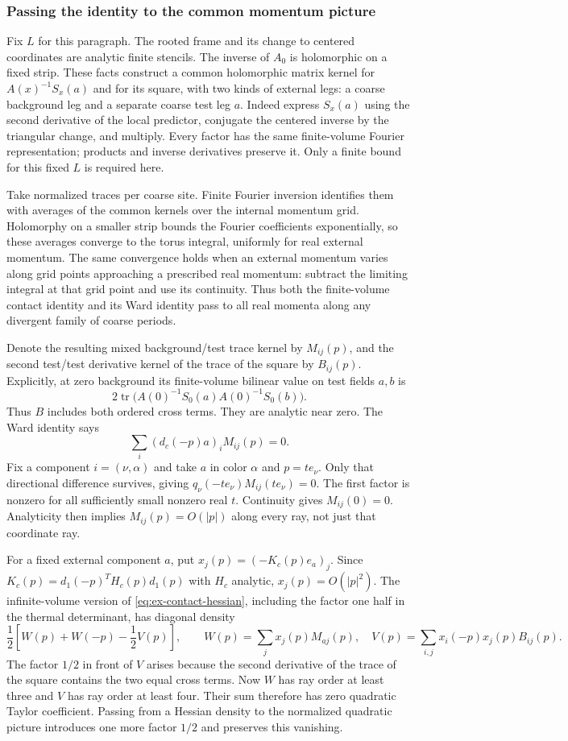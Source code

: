 \subsubsection{Passing the identity to the common momentum picture}
Fix $L$ for this paragraph. The rooted frame and its change to centered
coordinates are analytic finite stencils. The inverse of $A_0$ is
holomorphic on a fixed strip. These facts construct a common
holomorphic matrix kernel for
$A(x)^{-1}S_x(a)$ and for its square, with two kinds of external
legs: a coarse background leg and a separate coarse test leg $a$.
Indeed express $S_x(a)$ using the second derivative of the local
predictor, conjugate the centered inverse by the triangular change,
and multiply. Every factor has the same finite-volume Fourier
representation; products and inverse derivatives preserve it.
Only a finite bound for this fixed $L$ is required here.

Take normalized traces per coarse site. Finite Fourier inversion
identifies them with averages of the common kernels over the internal
momentum grid. Holomorphy on a smaller strip bounds the Fourier
coefficients exponentially, so these averages converge to the torus
integral, uniformly for real external momentum. The same convergence
holds when an external momentum varies along grid points approaching
a prescribed real momentum: subtract the limiting integral at that
grid point and use its continuity. Thus both the finite-volume
contact identity and its Ward identity pass to all real momenta
along any divergent family of coarse periods.

Denote the resulting mixed background/test trace kernel by
$M_{ij}(p)$, and the second test/test derivative kernel of the trace of the square
by $B_{ij}(p)$. Explicitly, at zero background its finite-volume
bilinear value on test fields $a,b$ is
\[
       2\operatorname{tr}\bigl(A(0)^{-1}S_0(a)A(0)^{-1}S_0(b)\bigr).
\]
Thus $B$ includes both ordered cross terms.
They are analytic near zero. The Ward identity says
\[
                    \sum_i(d_c(-p)a)_iM_{ij}(p)=0.
\]
Fix a component $i=(\nu,\alpha)$ and take $a$ in color $\alpha$
and $p=t e_\nu$. Only that directional difference survives, giving
$q_\nu(-te_\nu)M_{ij}(te_\nu)=0$. The first factor is nonzero
for all sufficiently small nonzero real $t$. Continuity gives
$M_{ij}(0)=0$. Analyticity then implies
$M_{ij}(p)=O(|p|)$ along every ray, not just that coordinate ray.

For a fixed external component $a$, put
$x_j(p)=(-K_c(p)e_a)_j$. Since
$K_c(p)=d_1(-p)^TH_c(p)d_1(p)$ with $H_c$ analytic,
$x_j(p)=O(|p|^2)$. The infinite-volume version of
\eqref{eq:ex-contact-hessian}, including the factor one half in
the thermal determinant, has diagonal density
\[
 \frac12\left[W(p)+W(-p)-\frac12V(p)\right],\qquad
 W(p)=\sum_jx_j(p)M_{aj}(p),\quad
 V(p)=\sum_{i,j}x_i(-p)x_j(p)B_{ij}(p).
\]
The factor $1/2$ in front of $V$ arises because the second derivative
of the trace of the square contains the two equal cross terms.
Now $W$ has ray order at least three and $V$ has ray order at
least four. Their sum therefore has zero quadratic Taylor
coefficient. Passing from a Hessian density to the normalized
quadratic picture introduces one more factor $1/2$ and preserves
this vanishing.

